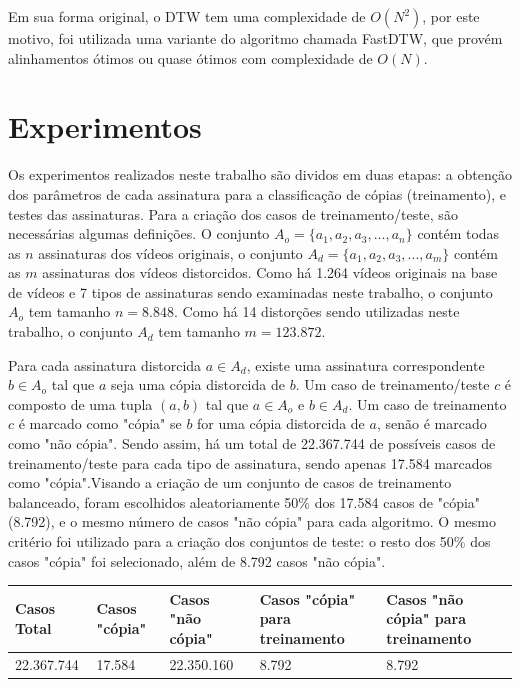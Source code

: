 
Em sua forma original, o DTW tem uma complexidade de $ O(N^{2}) $, por este motivo, foi utilizada uma variante do algoritmo chamada FastDTW, que provém alinhamentos ótimos ou quase ótimos com complexidade de $O(N)$.


\section{Experimentos}
\label{sec:met-Experimentos}

Os experimentos realizados neste trabalho são dividos em duas etapas: a obtenção dos parâmetros de cada assinatura para a classificação de cópias (treinamento), e testes das assinaturas. Para a criação dos casos de treinamento/teste, são necessárias algumas definições. O conjunto $A_o = \{a_1, a_2, a_3, ..., a_n\}$ contém todas as $n$ assinaturas dos vídeos originais, o conjunto $A_d = \{a_1, a_2, a_3, ..., a_m\}$ contém as $m$ assinaturas dos vídeos distorcidos. Como há 1.264 vídeos originais na base de vídeos e 7 tipos de assinaturas sendo examinadas neste trabalho, o conjunto $A_o$ tem tamanho $n=8.848$. Como há 14 distorções sendo utilizadas neste trabalho, o conjunto $A_d$ tem tamanho $m=123.872$.

Para cada assinatura distorcida $a \in A_d$, existe uma assinatura correspondente $b \in A_o$ tal que $a$ seja uma cópia distorcida de $b$. Um caso de treinamento/teste $c$ é composto de uma tupla $(a, b)$ tal que $a \in A_o$ e $b \in A_d$. Um caso de treinamento $c$ é marcado como "cópia" se $b$ for uma cópia distorcida de $a$, senão é marcado como "não cópia". Sendo assim, há um total de 22.367.744 de possíveis casos de treinamento/teste para cada tipo de assinatura, sendo apenas 17.584 marcados como "cópia".Visando a criação de um conjunto de casos de treinamento balanceado, foram escolhidos aleatoriamente 50\% dos 17.584 casos de "cópia" (8.792), e o mesmo número de casos "não cópia" para cada algoritmo. O mesmo critério foi utilizado para a criação dos conjuntos de teste: o resto dos 50\% dos casos "cópia" foi selecionado, além de 8.792 casos "não cópia".

\begin{table}[h]
    \centering
    \begin{tabular}{|l|l|l|l|l|}
        \hline
        Casos Total & Casos "cópia" & Casos "não cópia" & Casos "cópia" para treinamento & Casos "não cópia" para treinamento \\ \hline
        22.367.744 & 17.584 & 22.350.160 & 8.792 & 8.792 \\ \hline
    \end{tabular}
\end{table}


